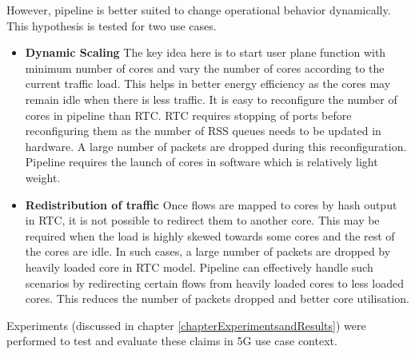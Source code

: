 However, pipeline is better suited to change operational behavior dynamically. This hypothesis is tested for two use cases.
\begin{itemize}
    \item \textbf{Dynamic Scaling} The key idea here is to start user plane function with minimum number of cores and vary
     the number of cores according to the current traffic load. This helps in better energy efficiency as the cores may
      remain idle when there is less traffic. It  is easy to reconfigure the number of cores in pipeline than RTC. RTC
       requires stopping of ports before reconfiguring them as the number of RSS queues needs to be updated in hardware. A large number of packets are dropped during this reconfiguration. Pipeline requires the launch of cores in software which is relatively light weight.
    \item \textbf{Redistribution of traffic}  Once flows are mapped to cores by hash output in RTC, it is not possible to redirect them to another core. This may be required when the load is
     highly skewed towards some cores and the rest of the cores are idle. In such cases, a large number of packets are
      dropped by heavily loaded core in RTC model. 
    Pipeline can effectively handle such scenarios by redirecting certain flows from heavily loaded cores to less loaded cores. This reduces the number of packets dropped and better core utilisation. 
\end{itemize}

Experiments (discussed in chapter \ref{chapterExperimentsandResults}) were performed to test and evaluate these claims in 5G use case context. 
